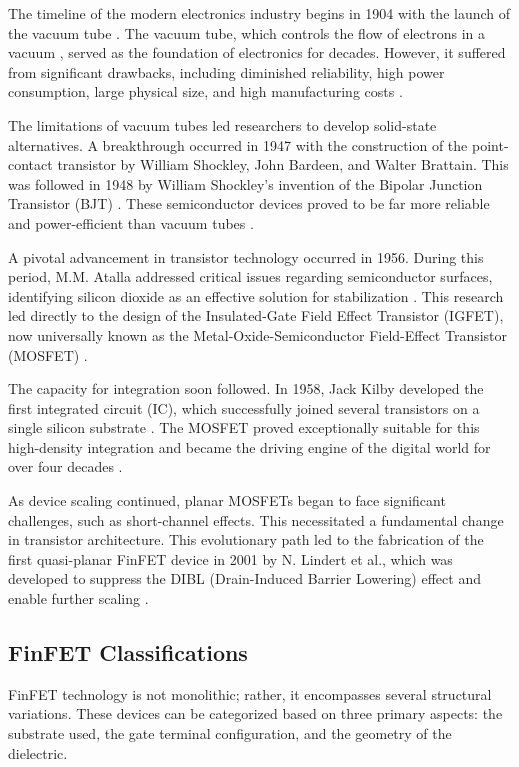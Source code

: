 	The timeline of the modern electronics industry begins in 1904 with the launch of the vacuum tube \cite{FinFET2}. The vacuum tube, which controls the flow of electrons in a vacuum \cite{FinFET2}, served as the foundation of electronics for decades. However, it suffered from significant drawbacks, including diminished reliability, high power consumption, large physical size, and high manufacturing costs \cite{FinFET2}.\par

	The limitations of vacuum tubes led researchers to develop solid-state alternatives. A breakthrough occurred in 1947 with the construction of the point-contact transistor by William Shockley, John Bardeen, and Walter Brattain. This was followed in 1948 by William Shockley's invention of the Bipolar Junction Transistor (BJT) \cite{FinFET2}. These semiconductor devices proved to be far more reliable and power-efficient than vacuum tubes \cite{FinFET2}.\par

	A pivotal advancement in transistor technology occurred in 1956. During this period, M.M. Atalla addressed critical issues regarding semiconductor surfaces, identifying silicon dioxide as an effective solution for stabilization \cite{FinFET2}. This research led directly to the design of the Insulated-Gate Field Effect Transistor (IGFET), now universally known as the Metal-Oxide-Semiconductor Field-Effect Transistor (MOSFET) \cite{FinFET2}.\par

	The capacity for integration soon followed. In 1958, Jack Kilby developed the first integrated circuit (IC), which successfully joined several transistors on a single silicon substrate \cite{FinFET2}. The MOSFET proved exceptionally suitable for this high-density integration and became the driving engine of the digital world for over four decades \cite{FinFET2}.\par

	As device scaling continued, planar MOSFETs began to face significant challenges, such as short-channel effects. This necessitated a fundamental change in transistor architecture. This evolutionary path led to the fabrication of the first quasi-planar FinFET device in 2001 by N. Lindert et al., which was developed to suppress the DIBL (Drain-Induced Barrier Lowering) effect and enable further scaling \cite{FinFET2}.\par

	\subsection{FinFET Classifications}
	FinFET technology is not monolithic; rather, it encompasses several structural variations. These devices can be categorized based on three primary aspects: the substrate used, the gate terminal configuration, and the geometry of the dielectric.\break

